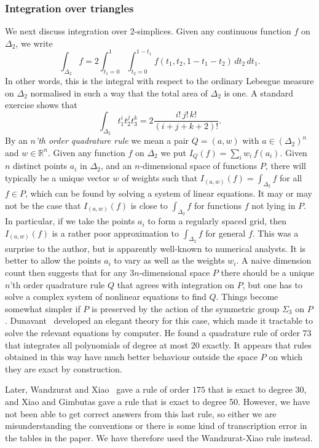 \documentclass[reqno]{amsart}
\newcommand{\Dl}        {\Delta}
\newcommand{\Sg}        {\Sigma}
\newcommand{\R}         {{\mathbb{R}}}
\renewcommand{\:}{\colon}
\theoremstyle{definition}
\begin{document}
\subsubsection{Integration over triangles}

We next discuss integration over $2$-simplices.  Given any continuous
function $f$ on $\Dl_2$, we write
\[ \int_{\Dl_2} f =
    2\int_{t_1=0}^1\int_{t_2=0}^{1-t_1} f(t_1,t_2,1-t_1-t_2)
      \,dt_2\,dt_1.
\]
In other words, this is the integral with respect to the ordinary
Lebesgue measure on $\Dl_2$ normalised in such a way that the total
area of $\Dl_2$ is one.  A standard exercise shows that
\[ \int_{\Dl_2} t_1^it_2^jt_3^k = 2\frac{i!\,j!\,k!}{(i+j+k+2)!}. \]
By an \emph{$n$'th order quadrature rule} we mean a pair $Q=(a,w)$
with $a\in(\Dl_2)^n$ and $w\in\R^n$.  Given any function $f$ on
$\Dl_2$ we put $I_Q(f)=\sum_i w_i\,f(a_i)$.  Given $n$ distinct points
$a_i$ in $\Dl_2$, and an $n$-dimensional space of functions $P$, there
will typically be a unique vector $w$ of weights such that
$I_{(a,w)}(f)=\int_{\Dl_2}f$ for all $f\in P$, which can be found by
solving a system of linear equations.  It may or may not be
the case that $I_{(a,w)}(f)$ is close to $\int_{\Dl_2}f$ for functions
$f$ not lying in $P$.  In particular, if we take the points $a_i$ to
form a regularly spaced grid, then $I_{(a,w)}(f)$ is a rather poor
approximation to $\int_{\Dl_2}f$ for general $f$.  This was a surprise
to the author, but is apparently well-known to numerical analysts.  It
is better to allow the points $a_i$ to vary as well as the weights
$w_i$.  A naive dimension count then suggests that for any
$3n$-dimensional space $P$ there should be a unique $n$'th order
quadrature rule $Q$ that agrees with integration on $P$, but one has
to solve a complex system of nonlinear equations to find $Q$.  Things
become somewhat simpler if $P$ is preserved by the action of the
symmetric group $\Sg_3$ on $P$.  Dunavant~\cite{du:hde} developed an
elegant theory for this case, which made it tractable to solve the
relevant equations by computer.  He found a quadrature rule of order
$73$ that integrates all polynomials of degree at most $20$ exactly.
It appears that rules obtained in this way have much better behaviour
outside the space $P$ on which they are exact by construction.

Later, Wandzurat and Xiao~\cite{waxi:sqr} gave a rule of order $175$
that is exact to degree 30, and Xiao and Gimbutas gave a rule that is
exact to degree 50.  However, we have not been able to get correct
answers from this last rule, so either we are misunderstanding the
conventions or there is some kind of transcription error in the tables
in the paper.  We have therefore used the Wandzurat-Xiao rule
instead.
\end{document}
